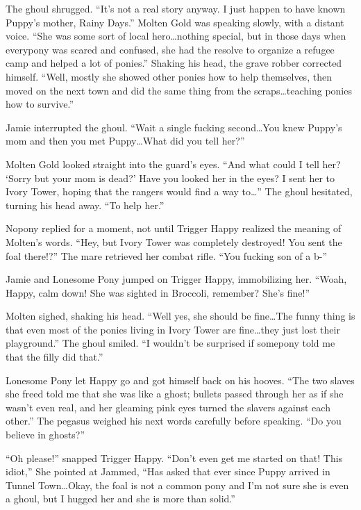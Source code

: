 The ghoul shrugged. ``It's not a real story anyway. I just happen to have known Puppy's mother, Rainy Days.'' Molten Gold was speaking slowly, with a distant voice. ``She was some sort of local hero\dots nothing special, but in those days when everypony was scared and confused, she had the resolve to organize a refugee camp and helped a lot of ponies.'' Shaking his head, the grave robber corrected himself. ``Well, mostly she showed other ponies how to help themselves, then moved on the next town and did the same thing from the scraps\dots teaching ponies how to survive.''

Jamie interrupted the ghoul. ``Wait a single fucking second\dots You knew Puppy's mom and then you met Puppy\dots What did you tell her?''

Molten Gold looked straight into the guard's eyes. ``And what could I tell her? `Sorry but your mom is dead?' Have you looked her in the eyes? I sent her to Ivory Tower, hoping that the rangers would find a way to\dots'' The ghoul hesitated, turning his head away. ``To help her.''

Nopony replied for a moment, not until Trigger Happy realized the meaning of Molten's words. ``Hey, but Ivory Tower was completely destroyed! You sent the foal there!?'' The mare retrieved her combat rifle. ``You fucking son of a b-''

Jamie and Lonesome Pony jumped on Trigger Happy, immobilizing her. ``Woah, Happy, calm down! She was sighted in Broccoli, remember? She's fine!''

Molten sighed, shaking his head. ``Well yes, she should be fine\dots The funny thing is that even most of the ponies living in Ivory Tower are fine\dots they just lost their playground.'' The ghoul smiled. ``I wouldn't be surprised if somepony told me that the filly did that.''

Lonesome Pony let Happy go and got himself back on his hooves. ``The two slaves she freed told me that she was like a ghost; bullets passed through her as if she wasn't even real, and her gleaming pink eyes turned the slavers against each other.'' The pegasus weighed his next words carefully before speaking. ``Do you believe in ghosts?''

``Oh please!'' snapped Trigger Happy. ``Don't even get me started on that! This idiot,'' She pointed at Jammed, ``Has asked that ever since Puppy arrived in Tunnel Town\dots Okay, the foal is not a common pony and I'm not sure she is even a ghoul, but I hugged her and she is more than solid.''

